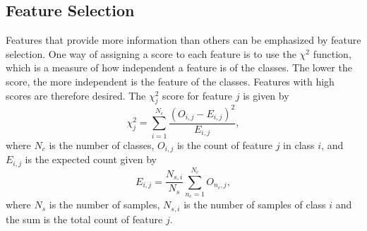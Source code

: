 \subsection{Feature Selection}
Features that provide more information than others can be emphasized by feature selection. One way of assigning a score to each feature is to use the $\chi^2$ function, which is a measure of how independent a feature is of the classes. The lower the score, the more independent is the feature of the classes. Features with high scores are therefore desired. The $\chi^2_j$ score for feature $j$ is given by
\[
\chi^2_j = \sum_{i=1}^{N_c} \frac{\left ( O_{i,j} - E_{i,j} \right )^2}{E_{i,j}},
\]
where $N_c$ is the number of classes, $O_{i,j}$ is the count of feature $j$ in class $i$, and $E_{i,j}$ is the expected count given by
\[
E_{i,j} = \frac{N_{s,i}}{N_s} \sum_{n_c=1}^{N_c} O_{n_c,j} ,
\]
where $N_s$ is the number of samples, $N_{s,i}$ is the number of samples of class $i$ and the sum is the total count of feature $j$.